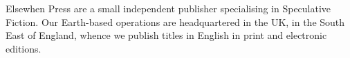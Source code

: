 Elsewhen Press are a small independent publisher specialising in
Speculative Fiction. Our Earth-based operations are headquartered in
the UK, in the South East of England, whence we publish titles in
English in print and electronic editions.
